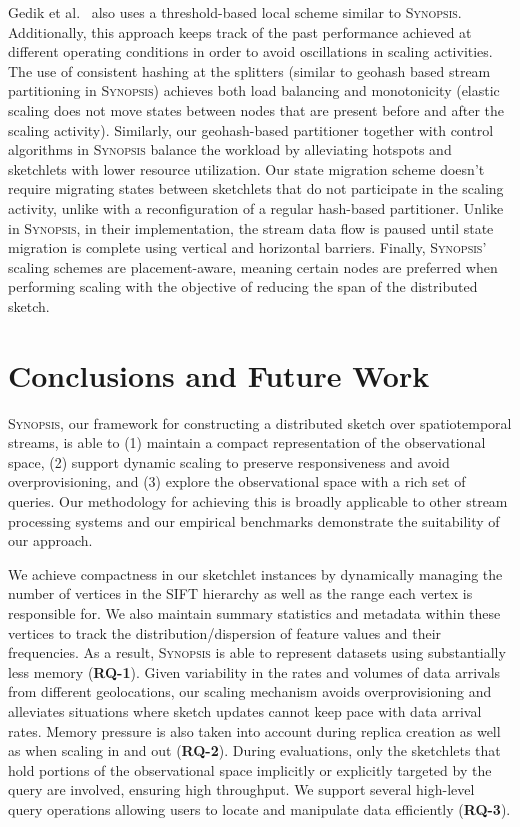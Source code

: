 \documentclass[9pt,journal,compsoc]{IEEEtran}
\begin{document}
Gedik et al.~\cite{schneider2009elastic} also uses a threshold-based local scheme similar to \textsc{Synopsis}. Additionally, this approach keeps track of the past performance achieved at different operating conditions in order to avoid oscillations in scaling activities.
The use of consistent hashing at the splitters (similar to geohash based stream partitioning in \textsc{Synopsis}) achieves both load balancing and monotonicity (elastic scaling does not move states between nodes that are present before and after the scaling activity).
Similarly, our geohash-based partitioner together with control algorithms in \textsc{Synopsis} balance the workload by alleviating hotspots and sketchlets with lower resource utilization.
Our state migration scheme doesn't require migrating states between sketchlets that do not participate in the scaling activity, unlike with a reconfiguration of a regular hash-based partitioner.
Unlike in \textsc{Synopsis}, in their implementation, the stream data flow is paused until state migration is complete using vertical and horizontal barriers.
Finally, \textsc{Synopsis}' scaling schemes are placement-aware, meaning certain nodes are preferred when performing scaling with the objective of reducing the span of the distributed sketch.
%
%
\vspace{-1em}
\section{Conclusions and Future Work}
\label{sec:conclusions}
\textsc{Synopsis}, our framework for constructing a distributed sketch over spatiotemporal streams, is able to (1) maintain a compact representation of the observational space, (2) support dynamic scaling to preserve responsiveness and avoid overprovisioning, and (3) explore the observational space with a rich set of queries. Our methodology for achieving this is broadly applicable to other stream processing systems and our empirical benchmarks demonstrate the suitability of our approach.

We achieve compactness in our sketchlet instances by dynamically managing the number of vertices in the SIFT hierarchy as well as the range each vertex is responsible for. We also maintain summary statistics and metadata within these vertices to track the distribution/dispersion of feature values and their frequencies. As a result, \textsc{Synopsis} is able to represent datasets using substantially less memory (\textbf{RQ-1}). Given variability in the rates and volumes of data arrivals from different geolocations, our scaling mechanism avoids overprovisioning and alleviates situations where sketch updates cannot keep pace with data arrival rates. Memory pressure is also taken into account during replica creation as well as when scaling in and out (\textbf{RQ-2}). During evaluations, only the sketchlets that hold portions of the observational space implicitly or explicitly targeted by the query are involved, ensuring high throughput. We support several high-level query operations allowing users to locate and manipulate data efficiently (\textbf{RQ-3}).
\end{document}
